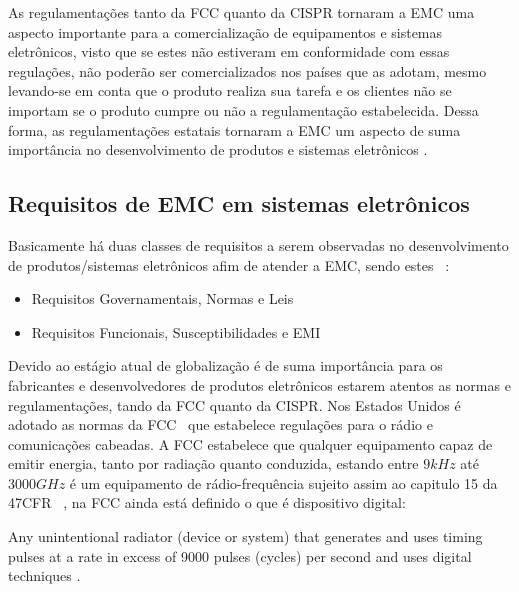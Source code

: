 As regulamentações tanto da FCC quanto da CISPR tornaram a EMC uma aspecto importante para a comercialização de equipamentos e sistemas eletrônicos, visto que se estes não estiveram em conformidade com essas regulações, não poderão ser comercializados nos países que as adotam, mesmo levando-se em conta que o produto realiza sua tarefa e os clientes não se importam se o produto cumpre ou não a regulamentação estabelecida. Dessa forma, as regulamentações estatais tornaram a EMC um aspecto de suma importância no desenvolvimento de produtos e sistemas eletrônicos \cite[p.~12]{paul2006}.

\subsection{Requisitos de EMC em sistemas eletrônicos}
Basicamente há duas classes de requisitos a serem observadas no desenvolvimento de produtos/sistemas eletrônicos afim de atender a EMC, sendo estes ~\cite[p.~49]{paul2006}:

\begin{itemize}
 \item Requisitos Governamentais, Normas e Leis
 \item Requisitos Funcionais, Susceptibilidades e EMI
\end{itemize}

Devido ao estágio atual de globalização é de suma importância para os fabricantes e desenvolvedores de produtos eletrônicos estarem atentos as normas e regulamentações, tando da FCC quanto da CISPR. Nos Estados Unidos é adotado as normas da FCC~\cite{fcc47} que estabelece regulações para o rádio e comunicações cabeadas. A FCC estabelece que qualquer equipamento capaz de emitir energia, tanto por radiação quanto conduzida, estando entre $9kHz$ até $3000 GHz$ é um equipamento de rádio-frequência sujeito assim ao capitulo 15 da 47CFR ~, na FCC ainda está definido o que é dispositivo digital:

\begin{citacao}[english]
Any unintentional radiator (device or system) that generates and uses timing pulses at a
rate in excess of 9000 pulses (cycles) per second and uses digital techniques .
\end{citacao}


